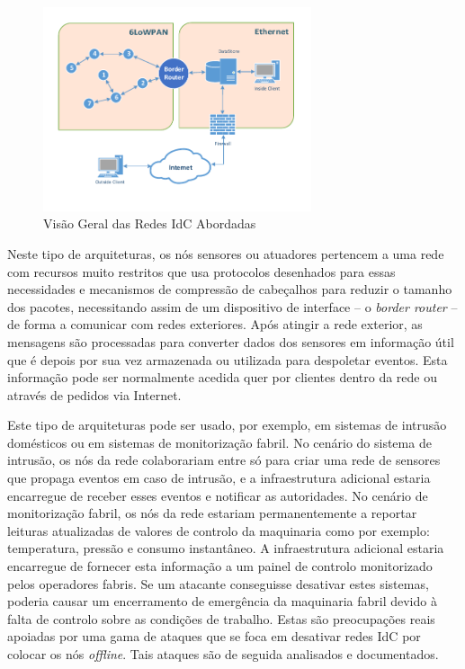 \documentclass{llncs}
\begin{document}
\begin{figure}
  \centering
  \includegraphics[height=6cm,keepaspectratio]{figures/Network_Overview.pdf}
  \caption{Visão Geral das Redes IdC Abordadas}
  \label{fig:net_overview}
\end{figure}

Neste tipo de arquiteturas, os nós sensores ou atuadores pertencem a uma rede com recursos muito restritos que usa protocolos desenhados para essas necessidades e mecanismos de compressão de cabeçalhos para reduzir o tamanho dos pacotes, necessitando assim de um dispositivo de interface -- o \textit{border router} -- de forma a comunicar com redes exteriores. Após atingir a rede exterior, as mensagens são processadas para converter dados dos sensores em informação útil que é depois por sua vez armazenada ou utilizada para despoletar eventos. Esta informação pode ser normalmente acedida quer por clientes dentro da rede ou através de pedidos via Internet.

Este tipo de arquiteturas pode ser usado, por exemplo, em sistemas de intrusão domésticos ou em sistemas de monitorização fabril. No cenário do sistema de intrusão, os nós da rede colaborariam entre só para criar uma rede de sensores que propaga eventos em caso de intrusão, e a infraestrutura adicional estaria encarregue de receber esses eventos e notificar as autoridades. No cenário de monitorização fabril, os nós da rede estariam permanentemente a reportar leituras atualizadas de valores de controlo da maquinaria como por exemplo: temperatura, pressão e consumo instantâneo. A infraestrutura adicional estaria encarregue de fornecer esta informação a um painel de controlo monitorizado pelos operadores fabris. Se um atacante conseguisse desativar estes sistemas, poderia causar um encerramento de emergência da maquinaria fabril devido à falta de controlo sobre as condições de trabalho. Estas são preocupações reais apoiadas por uma gama de ataques que se foca em desativar redes \ac{IdC} por colocar os nós \textit{offline}. Tais ataques são de seguida analisados e documentados.
\end{document}
